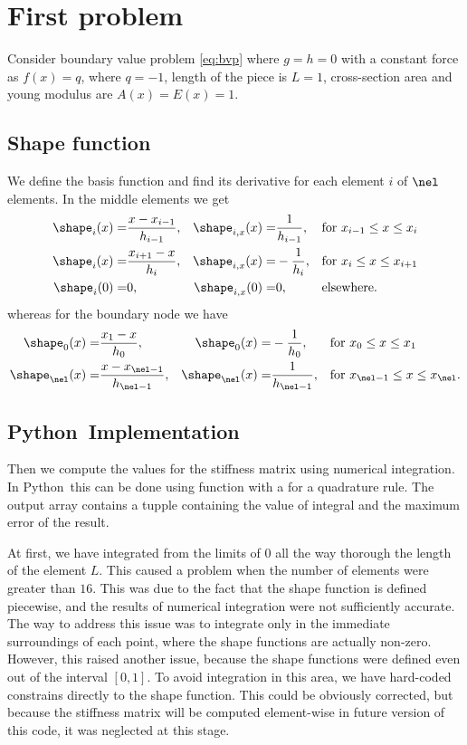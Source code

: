 \documentclass[twoside,a4paper,12pt]{article}
\newcommand{\prog}[1]{\textsf{#1}}
\newcommand{\python}{\prog{Python}}
\newcommand{\+}[2]{\newcommand#1{{\color{\notcolor}#2}}}
\newcommand{\1}[2]{\newcommand{#1}[1]{{\color{\notcolor}#2}}}
\newcommand{\2}[2]{\newcommand{#1}[2]{{\color{\notcolor}#2}}}
\begin{document}
\section{First problem}

Consider boundary value problem \eqref{eq:bvp} where $g=h =0$ with a
constant force as $f(x) = q$, where $q=-1$, length of the piece is
$L=1$, cross-section area and young modulus are $A(x) = E(x) = 1$.

\subsection{Shape function}

We define the basis function and find its derivative for each element
$i$ of $\nel$ elements. In the middle elements we get
\begin{align}
\shape_i(x) =& \frac{x-x_{i-1}}{h_{i-1}}, &\shape_{i,x}(x) =& \frac{1}{h_{i-1}},&&\text{for } x_{i-1} \leq x \leq x_i \\
\shape_i(x) =& \frac{x_{i+1}-x}{h_{i}},  &\shape_{i,x}(x) =& -\frac{1}{h_{i}}, &&\text{for }x_i \leq x \leq x_{i+1} \\
\shape_i(0) =& 0,                       &\shape_{i,x}(0) =& 0,                &&\text{elsewhere.}
\end{align}
%
whereas for the boundary node we have
%
\begin{align}
\shape_0(x) =& \frac{x_1-x}{h_{0}},             &\shape_0(x) =& -\frac{1}{h_{0}},                          &&\text{for } x_0 \leq x \leq x_{1} \\
\shape_\nel(x) =& \frac{x-x_{\nel-1}}{h_{\nel-1}},&\shape_\nel(x) =& \frac{1}{h_{\nel-1}},             &&\text{for } x_{\nel-1} \leq x \leq x_\nel .
\end{align}

\subsection{\python\ Implementation}

Then we compute the values for the stiffness matrix using numerical
integration. In \python\ this can be done using 
function with a  for a quadrature rule. The
output array contains a tupple containing the value of integral and
the maximum error of the result.

At first, we have integrated from the limits of $0$ all the way
thorough the length of the element $L$. This caused a problem when the
number of elements were greater than $16$. This was due to the fact
that the shape function is defined piecewise, and the results of
numerical integration were not sufficiently accurate. The way to
address this issue was to integrate only in the immediate surroundings
of each point, where the shape functions are actually
non-zero. However, this raised another issue, because the shape
functions were defined even out of the interval $[0,1]$. To avoid
integration in this area, we have hard-coded constrains directly to
the shape function. This could be obviously corrected, but because
the stiffness matrix will be computed element-wise in future version
of this code, it was neglected at this stage.
\end{document}
